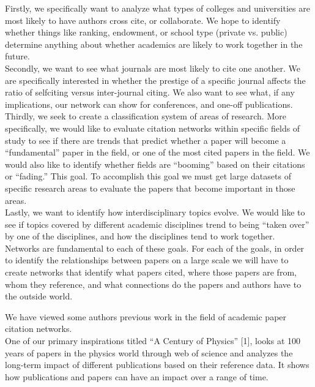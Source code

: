 \documentclass[times, 10pt,twocolumn]{article}
\begin{document}
Firstly, we specifically want to analyze what types of colleges and universities are most likely to have authors cross cite, or collaborate. We hope to identify whether things like ranking, endowment, or school type (private vs. public) determine anything about whether academics are likely to work together in the future.\\

Secondly, we want to see what journals are most likely to cite one another. We are specifically interested in whether the prestige of a specific journal affects the ratio of selfciting versus inter-journal citing. We also want to see what, if any implications, our network can show for conferences, and one-off publications.\\

Thirdly, we seek to create a classification system of areas of research. More specifically, we would like to evaluate citation networks within specific fields of study to see if there are trends that predict whether a paper will become a “fundamental” paper in the field, or one of the most cited papers in the field. We would also like to identify whether fields are “booming” based on their citations or “fading.” This goal. To accomplish this goal we must get large datasets of specific research areas to evaluate the papers that become important in those areas. \\

Lastly, we want to identify how interdisciplinary topics evolve. We would like to see if topics covered by different academic disciplines trend to being “taken over” by one of the disciplines, and how the disciplines tend to work together.\\

Networks are fundamental to each of these goals. For each of the goals, in order to identify the relationships between papers on a large scale we will have to create networks that identify what papers cited, where those papers are from, whom they reference, and what connections do the papers and authors have to the outside world.

We have viewed some authors previous work in the field of academic paper citation networks. \\

One of our primary inspirations titled “A Century of Physics” [1], looks at 100 years of papers in the physics world through web of science and analyzes the long-term impact of different publications based on their reference data. It shows how publications and papers can have an impact over a range of time.\\
\end{document}
